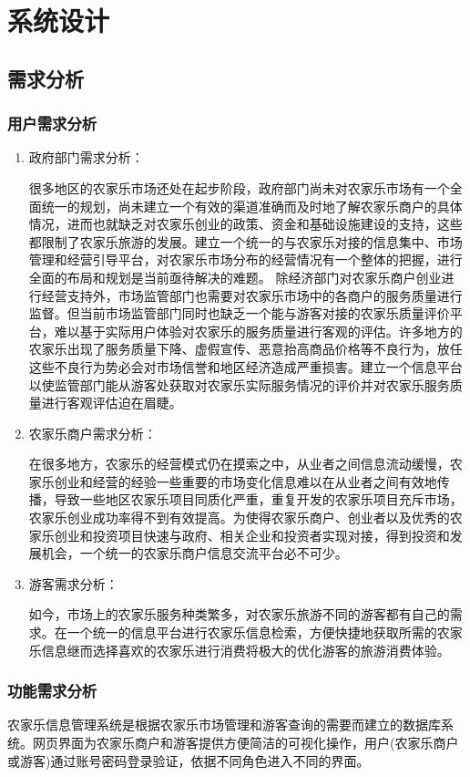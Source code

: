 \documentclass[]{article}
\begin{document}
	\section{系统设计}
	\subsection{需求分析}
	\subsubsection{用户需求分析}
	\begin{enumerate}
		\item 政府部门需求分析：
		
		很多地区的农家乐市场还处在起步阶段，政府部门尚未对农家乐市场有一个全面统一的规划，尚未建立一个有效的渠道准确而及时地了解农家乐商户的具体情况，进而也就缺乏对农家乐创业的政策、资金和基础设施建设的支持，这些都限制了农家乐旅游的发展\cite{RN31}。建立一个统一的与农家乐对接的信息集中、市场管理和经营引导平台，对农家乐市场分布的经营情况有一个整体的把握，进行全面的布局和规划是当前亟待解决的难题。
		除经济部门对农家乐商户创业进行经营支持外，市场监管部门也需要对农家乐市场中的各商户的服务质量进行监督。但当前市场监管部门同时也缺乏一个能与游客对接的农家乐质量评价平台，难以基于实际用户体验对农家乐的服务质量进行客观的评估。许多地方的农家乐出现了服务质量下降、虚假宣传、恶意抬高商品价格等不良行为，放任这些不良行为势必会对市场信誉和地区经济造成严重损害。建立一个信息平台以使监管部门能从游客处获取对农家乐实际服务情况的评价并对农家乐服务质量进行客观评估迫在眉睫。
		
		\item 农家乐商户需求分析：
		
		在很多地方，农家乐的经营模式仍在摸索之中，从业者之间信息流动缓慢，农家乐创业和经营的经验一些重要的市场变化信息难以在从业者之间有效地传播，导致一些地区农家乐项目同质化严重，重复开发的农家乐项目充斥市场，农家乐创业成功率得不到有效提高\cite{RN31}。为使得农家乐商户、创业者以及优秀的农家乐创业和投资项目快速与政府、相关企业和投资者实现对接，得到投资和发展机会，一个统一的农家乐商户信息交流平台必不可少。
		
		\item 游客需求分析：
		
		如今，市场上的农家乐服务种类繁多，对农家乐旅游不同的游客都有自己的需求。在一个统一的信息平台进行农家乐信息检索，方便快捷地获取所需的农家乐信息继而选择喜欢的农家乐进行消费将极大的优化游客的旅游消费体验。
	\end{enumerate}
	\subsubsection{功能需求分析}
	农家乐信息管理系统是根据农家乐市场管理和游客查询的需要而建立的数据库系统。网页界面为农家乐商户和游客提供方便简洁的可视化操作，用户(农家乐商户或游客)通过账号密码登录验证，依据不同角色进入不同的界面。
	
\end{document}
